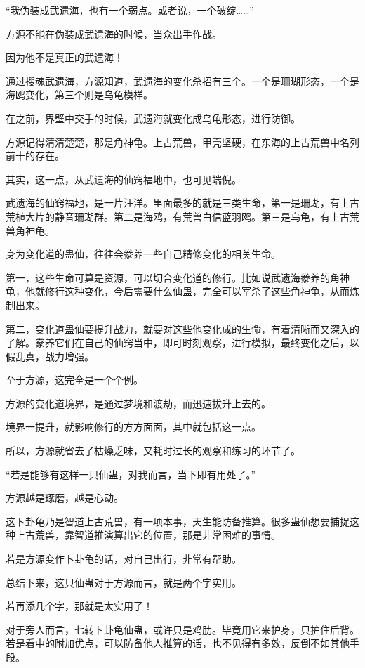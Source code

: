 \begin{this_body}
“我伪装成武遗海，也有一个弱点。或者说，一个破绽……”

方源不能在伪装成武遗海的时候，当众出手作战。

因为他不是真正的武遗海！

通过搜魂武遗海，方源知道，武遗海的变化杀招有三个。一个是珊瑚形态，一个是海鸥变化，第三个则是乌龟模样。

在之前，界壁中交手的时候，武遗海就变化成乌龟形态，进行防御。

方源记得清清楚楚，那是角神龟。上古荒兽，甲壳坚硬，在东海的上古荒兽中名列前十的存在。

其实，这一点，从武遗海的仙窍福地中，也可见端倪。

武遗海的仙窍福地，是一片汪洋。里面最多的就是三类生命，第一是珊瑚，有上古荒植大片的静音珊瑚群。第二是海鸥，有荒兽白信蓝羽鸥。第三是乌龟，有上古荒兽角神龟。

身为变化道的蛊仙，往往会豢养一些自己精修变化的相关生命。

第一，这些生命可算是资源，可以切合变化道的修行。比如说武遗海豢养的角神龟，他就修行这种变化，今后需要什么仙蛊，完全可以宰杀了这些角神龟，从而炼制出来。

第二，变化道蛊仙要提升战力，就要对这些他变化成的生命，有着清晰而又深入的了解。豢养它们在自己的仙窍当中，即可时刻观察，进行模拟，最终变化之后，以假乱真，战力增强。

至于方源，这完全是一个个例。

方源的变化道境界，是通过梦境和渡劫，而迅速拔升上去的。

境界一提升，就影响修行的方方面面，其中就包括这一点。

所以，方源就省去了枯燥乏味，又耗时过长的观察和练习的环节了。

“若是能够有这样一只仙蛊，对我而言，当下即有用处了。”

方源越是琢磨，越是心动。

这卜卦龟乃是智道上古荒兽，有一项本事，天生能防备推算。很多蛊仙想要捕捉这种上古荒兽，靠智道推演算出它的位置，那是非常困难的事情。

若是方源变作卜卦龟的话，对自己出行，非常有帮助。

总结下来，这只仙蛊对于方源而言，就是两个字实用。

若再添几个字，那就是太实用了！

对于旁人而言，七转卜卦龟仙蛊，或许只是鸡肋。毕竟用它来护身，只护住后背。若是看中的附加优点，可以防备他人推算的话，也不见得有多效，反倒不如其他手段。


\end{this_body}

